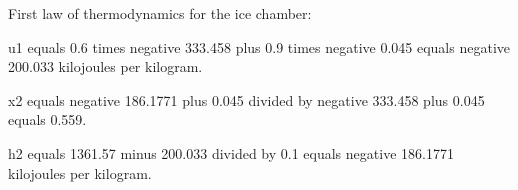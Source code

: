 First law of thermodynamics for the ice chamber:  

u1 equals 0.6 times negative 333.458 plus 0.9 times negative 0.045 equals negative 200.033 kilojoules per kilogram.  

x2 equals negative 186.1771 plus 0.045 divided by negative 333.458 plus 0.045 equals 0.559.  

h2 equals 1361.57 minus 200.033 divided by 0.1 equals negative 186.1771 kilojoules per kilogram.